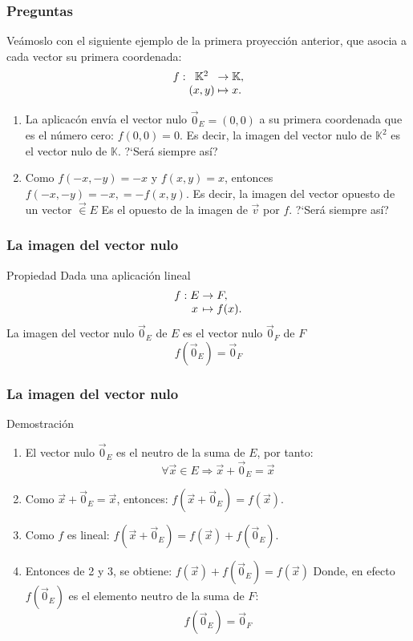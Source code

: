 \documentclass{beamer}
\begin{document}
\begin{frame}
  \frametitle{Preguntas}
Ve\'amoslo con el siguiente ejemplo de la primera proyecci\'on anterior, que asocia a cada vector su primera coordenada:
  \[
  \begin{array}{@{}r@{\;}c@{\;}c@{\;}l@{}}
    f: & \mathbb K^2 & \rightarrow & \mathbb K,   \\
       & (x,y) & \mapsto     & x.
  \end{array}
\]
  \begin{enumerate}
  \item La aplicac\'on env\'ia el vector nulo $\vec 0_E = (0,0)$ a su primera coordenada que es el n\'umero cero: $f(0,0) = 0$. Es decir, la imagen del vector nulo de $\mathbb K^2$ es el vector nulo de $\mathbb K$. ?`Ser\'a siempre as\'i?
  \item Como $f(-x,-y) = -x$ y $f(x,y) = x$, entonces $f(-x,-y) = -x, = -f(x,y)$. Es decir, la imagen del vector opuesto de un vector $\vec\in E$ Es el opuesto de la imagen de $\vec v$ por $f$. ?`Ser\'a siempre as\'i? 
\end{enumerate}
\end{frame}


\begin{frame}
  \frametitle{La imagen del vector nulo}
 \begin{block}{Propiedad} 
Dada una aplicaci\'on lineal
  \[
  \begin{array}{@{}r@{\;}c@{\;}c@{\;}l@{}}
    f: & E & \rightarrow & F,   \\
       & x & \mapsto     & f(x).
  \end{array}
\]
La imagen del vector nulo $\vec 0_E$ de $E$ es el vector nulo $\vec 0_F$ de $F$
\[f(\vec 0_E) = \vec 0_F\]
\end{block} 
 \end{frame}
 
 
\begin{frame}
  \frametitle{La imagen del vector nulo}
 \begin{block}{Demostraci\'on} 

\begin{enumerate}
\item El vector nulo $\vec 0_E$ es el neutro de la suma de $E$, por tanto:
\[\forall \vec x \in E \Rightarrow \vec x + \vec 0_E = \vec x\]
\item Como $\vec x + \vec 0_E = \vec x$, entonces: $f(\vec x + \vec 0_E) = f(\vec x)$.
\item Como $f$ es lineal: $f(\vec x + \vec 0_E) = f(\vec x) + f(\vec 0_E)$.
\item Entonces de 2 y 3, se obtiene: $f(\vec x)+ f(\vec 0_E) = f(\vec x)$
Donde, en efecto $f(\vec 0_E)$ es el elemento neutro de la suma de $F$: 
\[f(\vec 0_E) = \vec 0_F\]
\end{enumerate}
\end{block} 
 \end{frame}
 
\end{document}
